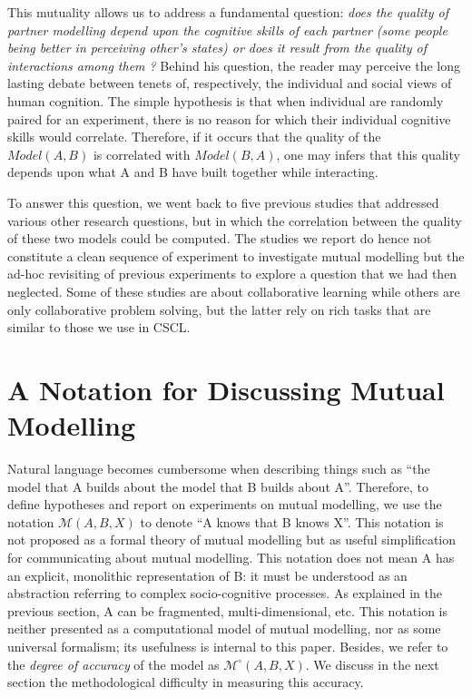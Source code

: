 \documentclass[natbib]{svjour3}
\newcommand{\A}{A\xspace}
\newcommand{\B}{B\xspace}
\newcommand{\model}[3]{{$\mathcal{M}(#1, #2, #3)$}}
\newcommand{\Model}[3]{{$\mathcal{M}^{\circ}(#1, #2, #3)$}}
\begin{document}
This mutuality allows us to address a fundamental question: \emph{does the
quality of partner modelling depend upon the cognitive skills of each partner
(some people being better in perceiving other's states) or does it result from
the quality of interactions among them ?} Behind his question, the reader may
perceive the long lasting debate between tenets of, respectively, the individual
and social views of human cognition.  The simple hypothesis is that when
individual are randomly paired for an experiment, there is no reason for which
their individual cognitive skills would correlate. Therefore, if it occurs that
the quality of the $Model(A,B)$ is correlated with $Model(B,A)$, one may infers
that this quality depends upon what \A and \B have built together while
interacting.

To answer this question, we went back to five previous studies that addressed
various other research questions, but in which the correlation between the
quality of these two models could be computed.  The studies we report do hence
not constitute a clean sequence of experiment to investigate mutual modelling but
the ad-hoc revisiting of previous experiments to explore a question that we had
then neglected. Some of these studies are about collaborative learning while
others are only collaborative problem solving, but the latter rely on rich tasks
that are similar to those we use in CSCL.

\section{A Notation for Discussing Mutual Modelling }

Natural language becomes cumbersome when describing things such as ``the model
that \A builds about the model that \B builds about A''. Therefore, to define
hypotheses and report on experiments on mutual modelling, we use  the notation
\model{A}{B}{X} to denote ``\A knows that \B knows X''. This  notation is not
proposed as a formal theory of mutual modelling but as useful simplification for
communicating about mutual modelling. This notation does not mean \A has an
explicit, monolithic representation of \B: it must be understood as an
abstraction referring to complex socio-cognitive processes.  As explained in the
previous section, \A can be fragmented, multi-dimensional, etc. This notation
is neither presented as a computational model of mutual modelling, nor as some
universal formalism; its usefulness is internal to this paper.  Besides, we
refer to the \emph{degree of accuracy} of the model as \Model{A}{B}{X}. We
discuss in the next section the methodological difficulty in measuring this
accuracy.
\end{document}
